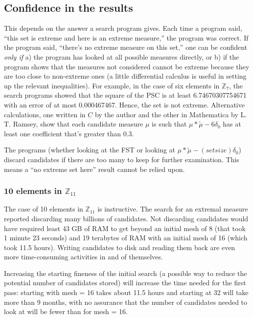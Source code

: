 \documentclass[letter,11pt]{amsart}
\numberwithin{theorem}{section}
\theoremstyle{remark}
\numberwithin{equation}{section}
\newcommand\Zp[2]{\texttt{$\mathbb Z_{#1}^{\	#2}$}}
\begin{document}
\subsection{Confidence in the results} This depends on the answer a search program gives.
 Each time a program
said, ``this set is extreme and here is an extreme measure,'' the program was correct. If the program
said, ``there's no extreme measure on this set,'' one can be confident \emph{only if} a) the
program has looked at all possible measures directly, or b) if the program shows that
 the measures not considered cannot be extreme because
they are too close to non-extreme ones (a little differential calculus is useful in
setting up the relevant inequalities). For example, in the case of six elements in \Zp7{}, the
search programs showed that  the square of the PSC is at least  6.74670307754671 
with an error of at most 0.000467467. Hence, the set is not extreme. Alternative calculations, one written in $C$ by the author
and the other
in Mathematica by L. T. Ramsey, show that each candidate measure $\mu$ is such that $\mu*\tilde\mu-6\delta_0$
has at least one coefficient that's greater than 0.3.

The programs (whether looking at the FST or looking at $\mu*\widetilde\mu-(setsize)\delta_0$)  discard
candidates if there are too many to keep for further examination. This means  a ``no extreme set here''
result cannot be relied upon. 

\subsubsection{ 10 elements in \Zp{11}{}} The case of 10 elements in \Zp{11}{} is instructive. The
 search for an extremal measure
 reported  discarding  many billions  of candidates. Not discarding candidates would have required
least 43 GB of RAM to get beyond an initial mesh of 8 (that took 1 minute 23 seconds) 
and 19 terabytes of RAM with an initial mesh of 16 (which took 11.5 hours).   Writing candidates to disk and reading them back are even more time-consuming activities in and of themselves.
 
Increasing the starting fineness of the initial search
  (a possible way to reduce the potential number of candidates stored) will increase the time
  needed for the first pass: starting   with mesh = 16  takes about 11.5 hours and starting  at 32
 will take more than 9 months, with no assurance that the number of candidates needed to look at will be fewer
 than for mesh = 16. 
 
\end{document}
